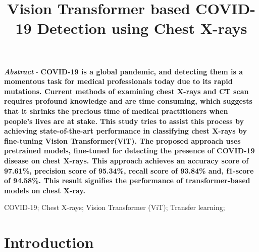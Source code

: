 \documentclass[conference]{IEEEtran}
\begin{document}
\title{\Huge{Vision Transformer based COVID-19 Detection using Chest X-rays}}

\author{
\and
{}
}




\maketitle



\small{\emph{\textbf{Abstract}} - \textbf{COVID-19 is a global pandemic, and detecting them is a momentous task for medical professionals today due to its rapid mutations. Current methods of examining chest X-rays and CT scan requires profound knowledge and are time consuming, which suggests that it shrinks the precious time of medical practitioners when people's lives are at stake. This study tries to assist this process by achieving state-of-the-art performance in classifying chest X-rays by fine-tuning Vision Transformer(ViT). The proposed approach uses pretrained models, fine-tuned for detecting the presence of COVID-19 disease on chest X-rays. This approach achieves an accuracy score of 97.61\%, precision score of 95.34\%, recall score of 93.84\% and, f1-score of 94.58\%. This result signifies the performance of transformer-based models on chest X-ray.}}

\begin{IEEEkeywords}
\small{COVID-19; Chest X-rays; Vision Transformer (ViT); Transfer learning;}
\end{IEEEkeywords}

\IEEEpeerreviewmaketitle




\section{\normalsize{Introduction}}
    
\end{document}
